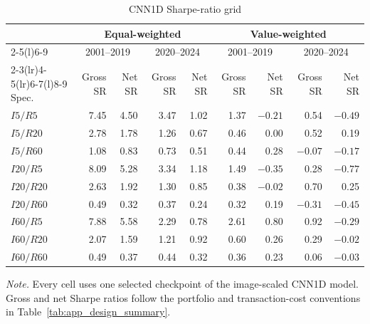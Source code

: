 \begin{table}[htbp]
\centering
\caption{CNN1D Sharpe-ratio grid}
\label{tab:app_cnn1d_grid}
\scriptsize
\setlength{\tabcolsep}{4.2pt}
\begin{tabular}{@{}lrrrrrrrr@{}}
\toprule
& \multicolumn{4}{c}{Equal-weighted} & \multicolumn{4}{c}{Value-weighted} \\
\cmidrule(lr){2-5}\cmidrule(l){6-9}
& \multicolumn{2}{c}{2001--2019} & \multicolumn{2}{c}{2020--2024}
& \multicolumn{2}{c}{2001--2019} & \multicolumn{2}{c}{2020--2024} \\
\cmidrule(lr){2-3}\cmidrule(lr){4-5}\cmidrule(lr){6-7}\cmidrule(l){8-9}
Spec. & Gross SR & Net SR & Gross SR & Net SR & Gross SR & Net SR & Gross SR & Net SR \\
\midrule
$I5/R5$   & 7.45 & 4.50 & 3.47 & 1.02 & 1.37 & $-0.21$ & 0.54 & $-0.49$ \\
$I5/R20$  & 2.78 & 1.78 & 1.26 & 0.67 & 0.46 & 0.00 & 0.52 & 0.19 \\
$I5/R60$  & 1.08 & 0.83 & 0.73 & 0.51 & 0.44 & 0.28 & $-0.07$ & $-0.17$ \\
$I20/R5$  & 8.09 & 5.28 & 3.34 & 1.18 & 1.49 & $-0.35$ & 0.28 & $-0.77$ \\
$I20/R20$ & 2.63 & 1.92 & 1.30 & 0.85 & 0.38 & $-0.02$ & 0.70 & 0.25 \\
$I20/R60$ & 0.49 & 0.32 & 0.37 & 0.24 & 0.32 & 0.19 & $-0.31$ & $-0.45$ \\
$I60/R5$  & 7.88 & 5.58 & 2.29 & 0.78 & 2.61 & 0.80 & 0.92 & $-0.29$ \\
$I60/R20$ & 2.07 & 1.59 & 1.21 & 0.92 & 0.60 & 0.26 & 0.29 & $-0.02$ \\
$I60/R60$ & 0.49 & 0.37 & 0.44 & 0.32 & 0.36 & 0.23 & 0.06 & $-0.03$ \\
\bottomrule
\end{tabular}
\begin{minipage}{\textwidth}
\footnotesize\textit{Note.} Every cell uses one selected checkpoint of the image-scaled CNN1D model. Gross and net Sharpe ratios follow the portfolio and transaction-cost conventions in Table~\ref{tab:app_design_summary}.
\end{minipage}
\end{table}


